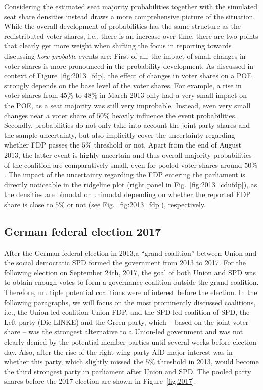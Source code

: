 \documentclass[smallcondensed]{svjour3}     %
\begin{document}
Considering the estimated seat majority probabilities together with
the simulated seat share densities instead draws a more comprehensive picture
of the situation.
While the overall development of probabilities has the same structure
as the redistributed voter shares, i.e., there is an increase over time,
there are two points that clearly get more weight when shifting
the focus in reporting towards discussing {\it how probable} events are:
First of all, the impact of small changes in voter shares is more pronounced
in the probability development. As discussed in context of
Figure~\ref{fig:2013_fdp}, the effect of changes in voter shares on
a POE strongly depends on the base level of the voter shares.
For example, a rise in voter shares from $45\%$ to $48\%$ in March 2013 only had a
very small impact on the POE, as a seat majority was still very improbable.
Instead, even very small changes near a voter share of $50\%$ heavily influence
the event probabilities. Secondly, probabilities do not only take into account
the joint party shares and the sample uncertainty,
but also implicitly cover the uncertainty regarding whether FDP passes the $5\%$
threshold or not. Apart from the end of August 2013, the latter event
is highly uncertain and thus overall majority probabilities of
the coalition are comparatively small, even for pooled voter shares around $50\%$.
The impact of the uncertainty regarding the FDP entering the parliament is
directly noticeable in the ridgeline plot (right panel in Fig.~\ref{fig:2013_cdufdp}),
as the densities are bimodal or unimodal depending on whether the reported FDP
share is close to $5\%$ or not (see Fig.~\ref{fig:2013_fdp}), respectively.



\subsection{German federal election 2017} \label{subsec:2017}
After the German federal election in 2013,a ``grand coalition'' between Union and the social
democratic SPD formed the government from 2013 to 2017.
For the following election on September 24th, 2017, the goal of both Union and SPD
was to obtain enough votes to form a governance coalition outside the grand
coalition. Therefore, multiple potential coalitions were of interest before the
election. In the following paragraphs, we will focus on the most prominently
discussed coalitions, i.e., the Union-led coalition Union-FDP, and the
SPD-led coalition of SPD, the Left party (Die LINKE) and the Green party, which
-- based on the joint voter share -- was the strongest alternative to a Union-led
government and was not clearly denied by the potential member parties until several weeks
before election day.
Also, after the rise of the right-wing party AfD major interest was
in whether this party, which slightly missed the $5\%$ threshold in 2013,
would become the third strongest party in parliament after Union and SPD.
The pooled party shares before the 2017 election are shown in Figure~\ref{fig:2017}.
\end{document}
